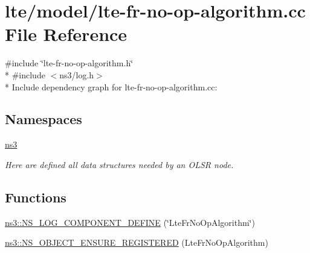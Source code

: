 \hypertarget{lte-fr-no-op-algorithm_8cc}{}\section{lte/model/lte-\/fr-\/no-\/op-\/algorithm.cc File Reference}
\label{lte-fr-no-op-algorithm_8cc}
{\ttfamily \#include \char`\"{}lte-\/fr-\/no-\/op-\/algorithm.\+h\char`\"{}}\\*
{\ttfamily \#include $<$ns3/log.\+h$>$}\\*
Include dependency graph for lte-\/fr-\/no-\/op-\/algorithm.cc\+:
\subsection*{Namespaces}
\begin{DoxyCompactItemize}
\item 
 \hyperlink{namespacens3}{ns3}
\begin{DoxyCompactList}\small\item\em Here are defined all data structures needed by an O\+L\+SR node. \end{DoxyCompactList}\end{DoxyCompactItemize}
\subsection*{Functions}
\begin{DoxyCompactItemize}
\item 
\hyperlink{namespacens3_ab6c2fd7af0c10d413c9f0d5c82bfc96a}{ns3\+::\+N\+S\+\_\+\+L\+O\+G\+\_\+\+C\+O\+M\+P\+O\+N\+E\+N\+T\+\_\+\+D\+E\+F\+I\+NE} (\char`\"{}Lte\+Fr\+No\+Op\+Algorithm\char`\"{})
\item 
\hyperlink{namespacens3_a5acf2be9e6f2ba1b83ed71e9be75733b}{ns3\+::\+N\+S\+\_\+\+O\+B\+J\+E\+C\+T\+\_\+\+E\+N\+S\+U\+R\+E\+\_\+\+R\+E\+G\+I\+S\+T\+E\+R\+ED} (Lte\+Fr\+No\+Op\+Algorithm)
\end{DoxyCompactItemize}
